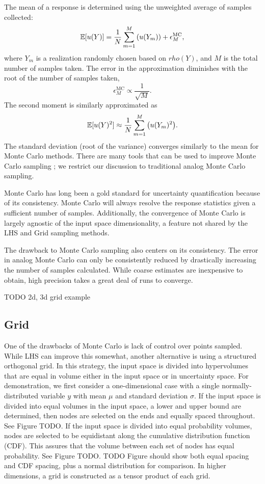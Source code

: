 The mean of a response is determined using the unweighted average of samples collected:
\begin{equation}
  \mathbb{E}[ u(Y)] = \frac{1}{N}\sum_{m=1}^M \qty(u(Y_m)) + \epsilon_M^{\text{MC}},
\end{equation}
where $Y_m$ is a realization randomly chosen based on $rho(Y)$, and $M$ is the total number of samples taken.
The error in the approximation diminishes with the root of the number of samples taken,
\begin{equation}
  \epsilon_M^{\text{MC}} \propto \frac{1}{\sqrt{M}}.
\end{equation}
The second moment is similarly approximated as
\begin{equation}
  \mathbb{E}[ u(Y)^2] \approx \frac{1}{N}\sum_{m=1}^M \qty(u(Y_m)^2).
\end{equation}
The standard deviation (root of the variance) converges similarly to the mean for Monte Carlo methods.  There
are many tools that can be used to improve Monte Carlo sampling \cite{mcvarred}\cite{mcnpvarred}; we restrict
our discussion to traditional analog Monte Carlo sampling.

Monte Carlo has long been a gold standard for uncertainty quantification because of its consistency.  Monte
Carlo will always resolve the response statistics given a sufficient number of samples.  Additionally, the
convergence of Monte Carlo is largely agnostic of the input space dimensionality, a feature not shared by the
LHS and Grid sampling methods.

The drawback to Monte Carlo sampling also centers on its consistency.  The error in analog Monte Carlo can only be
consistently reduced by drastically increasing the number of samples calculated.  While coarse estimates are
inexpensive to obtain, high precision takes a great deal of runs to converge.

TODO 2d, 3d grid example

\subsection{Grid}
One of the drawbacks of Monte Carlo is lack of control over points sampled.  While LHS can improve this
somewhat, another alternative is using a structured orthogonal grid.  In this strategy, the input space is
divided into hypervolumes that are equal in volume either in the input space or in uncertainty space.  For
demonstration, we first consider a one-dimensional case with a single normally-distributed variable $y$ with mean
$\mu$ and standard deviation $\sigma$.  If the input space is divided into equal volumes in the input space, a lower and upper bound are determined,
then nodes are selected on the ends and equally spaced throughout.  See Figure TODO.  If the input space is
divided into equal probability volumes, nodes are selected to be equidistant along the cumulative distribution
function (CDF).  This assures that the volume between each set of nodes has equal probability.  See Figure TODO.
TODO Figure should show both equal spacing and CDF spacing, plus a normal distribution for comparison.
In higher dimensions, a grid is constructed as a tensor product of each grid.

